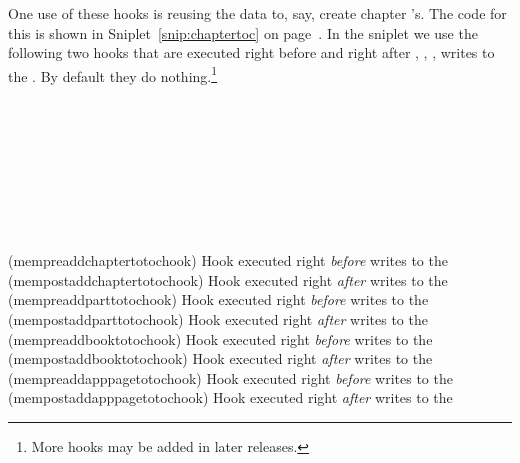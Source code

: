 One use of these \toc{} hooks is reusing the \toc{} data to, say,
create chapter \toc's. The code for this is shown in
Sniplet~\ref{snip:chaptertoc} on page~\pageref{snip:chaptertoc}. In
the sniplet we use the following two hooks that are executed right
before and right after \cmd{\chapter}, \cmd{\part}, \cmd{\book},
\cmd{\appendixpage}  writes to the \toc{}. By default
they do nothing.\footnote{More hooks may be added in later releases.}
\begin{syntax}
  \cmd{\mempreaddchaptertotochook}\\
  \cmd{\mempostaddchaptertotochook}\\
  \cmd{\mempreaddparttotochook}\\
  \cmd{\mempostaddparttotochook}\\
  \cmd{\mempreaddbooktotochook}\\
  \cmd{\mempostaddbooktotochook}\\
  \cmd{\mempreaddapppagetotochook}\\
  \cmd{\mempostaddapppagetotochook}
\end{syntax}
\glossary(mempreaddchaptertotochook)%
  {}%
  {Hook executed right \emph{before}  writes to the \protect\toc{}}
\glossary(mempostaddchaptertotochook)%
  {}%
  {Hook executed right \emph{after}  writes to the \protect\toc{}}
\glossary(mempreaddparttotochook)%
  {}%
  {Hook executed right \emph{before}  writes to the \protect\toc{}}
\glossary(mempostaddparttotochook)%
  {}%
  {Hook executed right \emph{after}  writes to the \protect\toc{}}
\glossary(mempreaddbooktotochook)%
  {}%
  {Hook executed right \emph{before}  writes to the \protect\toc{}}
\glossary(mempostaddbooktotochook)%
  {}%
  {Hook executed right \emph{after}  writes to the \protect\toc{}}
\glossary(mempreaddapppagetotochook)%
  {}%
  {Hook executed right \emph{before}  writes to the \protect\toc{}}
\glossary(mempostaddapppagetotochook)%
  {}%
  {Hook executed right \emph{after}  writes to the \protect\toc{}}



